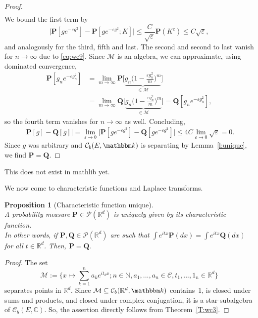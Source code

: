 \documentclass{article}
\newtheorem{proposition}{Proposition}[section]
\theoremstyle{definition}
\theoremstyle{step} \newtheorem{step}{Step}
\begin{document}
\begin{paracol}{2}
\begin{proof}
\begin{align*}
    \end{align*}
    We bound the first term by
    $$\big|\mathbf P[ge^{-\varepsilon g^2}] - \mathbf P[ge^{-\varepsilon
              g^2};K] \big| \leq \frac{C}{\sqrt{\varepsilon}} \mathbf P(K^c)
      \leq C\sqrt{\varepsilon},$$ and analogously for the third, fifth and
    last. The second and second to last vanish for $n\to\infty$ due to
    \eqref{eq:wc9}. Since $\mathcal M$ is an algebra, we can
    approximate, using dominated convergence,
    \begin{align*}
      \mathbf P[g_ne^{-\varepsilon g_n^2}] & = \lim_{m \to \infty} \mathbf
      P[\underbrace{g_n \Big(1 - \frac{\varepsilon
      g_n^2}{m}\Big)^m}_{\in\mathcal M}\Big]                               \\ & = \lim_{m \to \infty}
      \mathbf Q[\underbrace{g_n \Big(1 - \frac{\varepsilon
              g_n^2}{m}\Big)^m}_{\in\mathcal M}\Big] = \mathbf
      Q[g_ne^{-\varepsilon g_n^2}],
    \end{align*}
    so the fourth term vanishes for $n\to\infty$ as well. Concluding,
    \begin{align*}
      \big|\mathbf P[g] - \mathbf Q[g] \big| = \lim_{\varepsilon\to 0}
      \big|\mathbf P[ge^{-\varepsilon g^2}] - \mathbf Q[ge^{-\varepsilon
              g^2}] \big| \leq 4C \lim_{\varepsilon \to 0}\sqrt{\varepsilon} =
      0.
    \end{align*}
    Since $g$ was arbitrary and $\mathcal C_b(E,\mathbbm k)$ is
    separating by Lemma~\ref{l:unique}, we find $\mathbf P = \mathbf Q$.
  \end{proof}
  \switchcolumn

  This does not exist in mathlib yet.

  \switchcolumn*

  We now come to characteristic functions and Laplace transforms.

  \begin{proposition}[Characteristic function unique]
    \label{Pr:char1}\mbox{}\\
    A probability measure $\mathbf P \in\mathcal P(\mathbb R^d)$ is
    uniquely given by its characteristic function.  \\ In other words,
    if $\mathbf P, \mathbf Q \in\mathcal P(\mathbb R^d)$ are such that
    $\int e^{itx} \mathbf P(dx) = \int e^{itx} \mathbf Q(dx)$ for all
    $t\in\mathbb R^d$. Then, $\mathbf P = \mathbf Q$.
  \end{proposition}

  \begin{proof}
    The set
    $$\mathcal M:= \Big\{ x\mapsto \sum_{k=1}^n a_k e^{i t_k x}; n \in
      \mathbb N, a_1,...,a_n \in \mathcal C, t_1,...,1_n\in\mathbb
      R^d\Big\}$$ separates points in $\mathbb R^d$. Since $\mathcal M
      \subseteq \mathcal C_b(\mathbb R^d,\mathbbm k)$ contains~1, is
    closed under sums and products, and closed under complex
    conjugation, it is a star-subalgebra of $\mathcal C_b(E,\mathbb
      C)$. So, the assertion directly follows from Theorem~\ref{T:wc3}.
  \end{proof}


\end{paracol}
\end{document}
